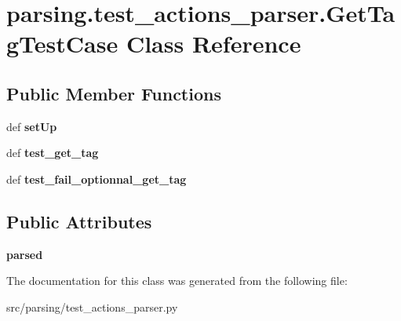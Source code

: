 \hypertarget{classparsing_1_1test__actions__parser_1_1_get_tag_test_case}{\section{parsing.\-test\-\_\-actions\-\_\-parser.\-Get\-Tag\-Test\-Case \-Class \-Reference}
\label{classparsing_1_1test__actions__parser_1_1_get_tag_test_case}
}
\subsection*{\-Public \-Member \-Functions}
\begin{DoxyCompactItemize}
\item 
\hypertarget{classparsing_1_1test__actions__parser_1_1_get_tag_test_case_a6a62ace7845c5c3b14cddb265cb7ec22}{def {\bfseries set\-Up}}\label{classparsing_1_1test__actions__parser_1_1_get_tag_test_case_a6a62ace7845c5c3b14cddb265cb7ec22}

\item 
\hypertarget{classparsing_1_1test__actions__parser_1_1_get_tag_test_case_a5ed27d7021e8b4c6eae6f4a0e1a86eda}{def {\bfseries test\-\_\-get\-\_\-tag}}\label{classparsing_1_1test__actions__parser_1_1_get_tag_test_case_a5ed27d7021e8b4c6eae6f4a0e1a86eda}

\item 
\hypertarget{classparsing_1_1test__actions__parser_1_1_get_tag_test_case_a1fb57c71f354272d0a93eb9b7c9c3dd7}{def {\bfseries test\-\_\-fail\-\_\-optionnal\-\_\-get\-\_\-tag}}\label{classparsing_1_1test__actions__parser_1_1_get_tag_test_case_a1fb57c71f354272d0a93eb9b7c9c3dd7}

\end{DoxyCompactItemize}
\subsection*{\-Public \-Attributes}
\begin{DoxyCompactItemize}
\item 
\hypertarget{classparsing_1_1test__actions__parser_1_1_get_tag_test_case_a09ed603e3a41d991f4d9a7626b659761}{{\bfseries parsed}}\label{classparsing_1_1test__actions__parser_1_1_get_tag_test_case_a09ed603e3a41d991f4d9a7626b659761}

\end{DoxyCompactItemize}


\-The documentation for this class was generated from the following file\-:\begin{DoxyCompactItemize}
\item 
src/parsing/test\-\_\-actions\-\_\-parser.\-py\end{DoxyCompactItemize}
